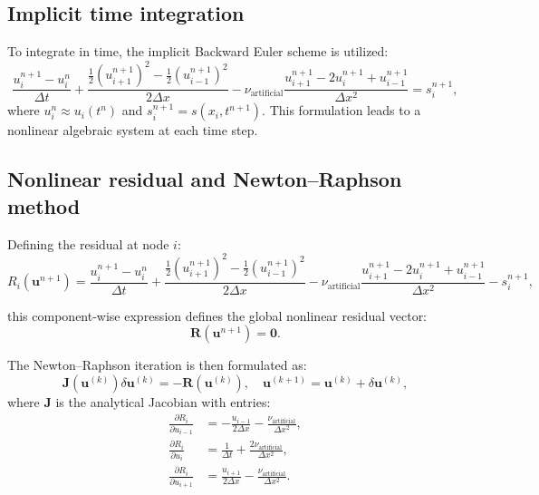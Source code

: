 \subsection{Implicit time integration}

To integrate in time, the implicit Backward Euler scheme is utilized:
\begin{equation}
\frac{u_i^{n+1}-u_i^n}{\Delta t}+\frac{\frac{1}{2}(u_{i+1}^{n+1})^2-\frac{1}{2}(u_{i-1}^{n+1})^2}{2\Delta x}-\nu_{\text{artificial}}\frac{u_{i+1}^{n+1}-2u_i^{n+1}+u_{i-1}^{n+1}}{\Delta x^2}=s_i^{n+1},
\label{eq:fd_fully_discrete}
\end{equation}
where \(u_i^n\approx u_i(t^n)\) and \(s_i^{n+1}=s(x_i,t^{n+1})\). This formulation leads to a nonlinear algebraic system at each time step.

\subsection{Nonlinear residual and Newton--Raphson method}

Defining the residual at node \(i\):
\begin{equation}
R_i(\mathbf{u}^{n+1}) = \frac{u_i^{n+1}-u_i^n}{\Delta t}+\frac{\frac{1}{2}(u_{i+1}^{n+1})^2-\frac{1}{2}(u_{i-1}^{n+1})^2}{2\Delta x}-\nu_{\text{artificial}}\frac{u_{i+1}^{n+1}-2u_i^{n+1}+u_{i-1}^{n+1}}{\Delta x^2}-s_i^{n+1},
\label{eq:residual_fd_component}
\end{equation}

this component-wise expression defines the global nonlinear residual vector:
\begin{equation}
\mathbf{R}(\mathbf{u}^{n+1}) = \mathbf{0}.
\label{eq:residual_fd_vector}
\end{equation}

The Newton--Raphson iteration is then formulated as:
\begin{equation}
\mathbf{J}(\mathbf{u}^{(k)})\delta \mathbf{u}^{(k)} = -\mathbf{R}(\mathbf{u}^{(k)}),\quad \mathbf{u}^{(k+1)}=\mathbf{u}^{(k)}+\delta \mathbf{u}^{(k)},
\label{eq:fd_newton_iteration}
\end{equation}
where \(\mathbf{J}\) is the analytical Jacobian with entries:
\begin{align}
\frac{\partial R_i}{\partial u_{i-1}}&=-\frac{u_{i-1}}{2\Delta x}-\frac{\nu_{\text{artificial}}}{\Delta x^2},\\[5pt]
\frac{\partial R_i}{\partial u_{i}}&=\frac{1}{\Delta t}+\frac{2\nu_{\text{artificial}}}{\Delta x^2},\\[5pt]
\frac{\partial R_i}{\partial u_{i+1}}&=\frac{u_{i+1}}{2\Delta x}-\frac{\nu_{\text{artificial}}}{\Delta x^2}.
\end{align}

